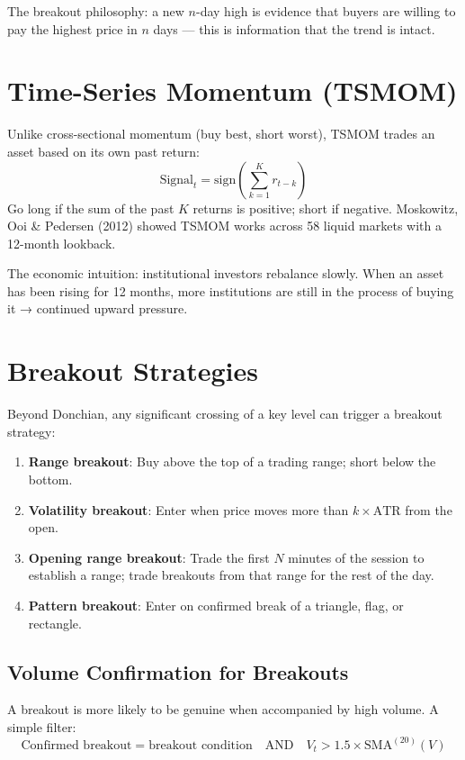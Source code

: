 \documentclass[12pt,a4paper,openany]{report}
\theoremstyle{definition}
\begin{document}
The breakout philosophy: a new $n$-day high is evidence that buyers are willing to pay the highest price in $n$ days — this is information that the trend is intact.

\section{Time-Series Momentum (TSMOM)}

Unlike cross-sectional momentum (buy best, short worst), TSMOM trades an asset based on its own past return:
\begin{equation}
  \text{Signal}_t = \text{sign}\!\left(\sum_{k=1}^{K} r_{t-k}\right)
\end{equation}
Go long if the sum of the past $K$ returns is positive; short if negative. Moskowitz, Ooi \& Pedersen (2012) showed TSMOM works across 58 liquid markets with a 12-month lookback.

The economic intuition: institutional investors rebalance slowly. When an asset has been rising for 12 months, more institutions are still in the process of buying it → continued upward pressure.

\section{Breakout Strategies}

Beyond Donchian, any significant crossing of a key level can trigger a breakout strategy:

\begin{enumerate}[label=\arabic*.]
  \item \textbf{Range breakout}: Buy above the top of a trading range; short below the bottom.
  \item \textbf{Volatility breakout}: Enter when price moves more than $k\times\text{ATR}$ from the open.
  \item \textbf{Opening range breakout}: Trade the first $N$ minutes of the session to establish a range; trade breakouts from that range for the rest of the day.
  \item \textbf{Pattern breakout}: Enter on confirmed break of a triangle, flag, or rectangle.
\end{enumerate}

\subsection{Volume Confirmation for Breakouts}

A breakout is more likely to be genuine when accompanied by high volume. A simple filter:
\[
  \text{Confirmed breakout} = \text{breakout condition} \quad \text{AND} \quad V_t > 1.5 \times \text{SMA}^{(20)}(V)
\]
\end{document}
